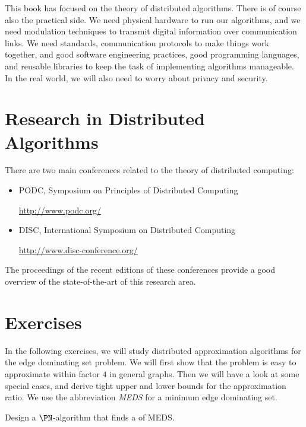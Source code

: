 This book has focused on the theory of distributed algorithms. There is of course also the practical side. We need physical hardware to run our algorithms, and we need modulation techniques to transmit digital information over communication links. We need standards, communication protocols to make things work together, and good software engineering practices, good programming languages, and reusable libraries to keep the task of implementing algorithms manageable. In the real world, we will also need to worry about privacy and security.


\section{Research in Distributed Algorithms}

There are two main conferences related to the theory of distributed computing:
\begin{itemize}
    \item PODC, Symposium on Principles of Distributed Computing

    \url{http://www.podc.org/}
    \item DISC, International Symposium on Distributed Computing

    \url{http://www.disc-conference.org/}
\end{itemize}
The proceedings of the recent editions of these conferences provide a good overview of the state-of-the-art of this research area.


\section{Exercises}

In the following exercises, we will study distributed approximation algorithms for the edge dominating set problem. We will first show that the problem is easy to approximate within factor $4$ in general graphs. Then we will have a look at some special cases, and derive tight upper and lower bounds for the approximation ratio. We use the abbreviation \emph{MEDS} for a minimum edge dominating set.

\begin{ex}\label{ex:edsfirst}
    Design a $\PN$-algorithm that finds a  of MEDS.
    
\end{ex}

